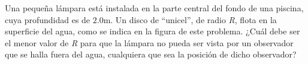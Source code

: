 
Una pequeña lámpara está instalada en la parte central del fondo de una piscina, cuya profundidad es de $2.0$m. Un disco de ``unicel'', de radio \textit{R}, flota en la superficie del agua, como se indica en la figura de este problema. ¿Cuál debe ser el menor valor de \textit{R} para que la lámpara no pueda ser vista por un observador que se halla fuera del agua, cualquiera que sea la posición de dicho observador?